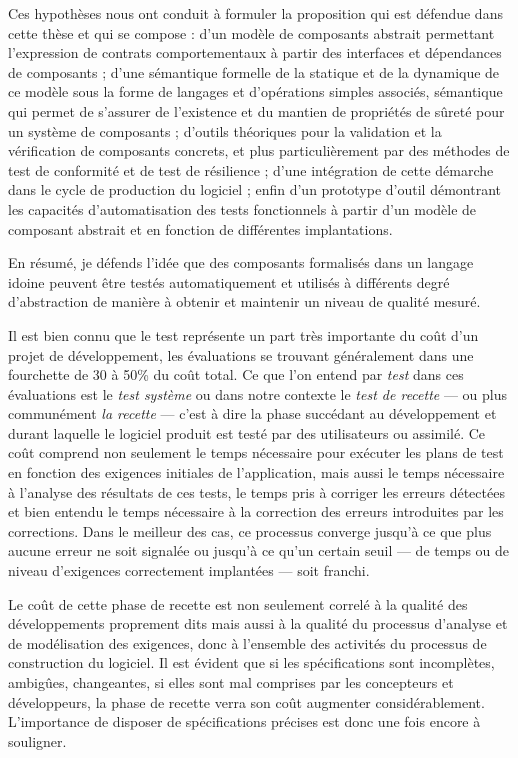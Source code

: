 Ces hypoth\`eses nous ont conduit \`a formuler la proposition qui
est d\'efendue dans cette th\`ese et qui se compose : d'un
mod\`ele de composants abstrait permettant l'expression de contrats
comportementaux \`a partir des interfaces et d\'ependances de
composants ; d'une s\'emantique formelle de la statique et de la dynamique de ce
mod\`ele sous la forme de langages et d'op\'erations simples
associ\'es, s\'emantique qui permet de s'assurer de l'existence et
du mantien de propri\'et\'es de s\^uret\'e pour un syst\`eme de
composants ; d'outils th\'eoriques pour la validation et la
v\'erification de composants concrets, et plus particuli\`erement par
des m\'ethodes de test de conformit\'e et de test de r\'esilience ;
d'une int\'egration de cette d\'emarche dans le cycle de production
du logiciel ; enfin d'un prototype d'outil d\'emontrant les
capacit\'es d'automatisation des tests fonctionnels \`a partir d'un
mod\`ele de composant abstrait et en fonction de diff\'erentes
implantations.

En r\'esum\'e, je d\'efends l'id\'ee que des composants
formalis\'es dans un langage idoine peuvent \^etre test\'es
automatiquement et utilis\'es \`a diff\'erents degr\'e
d'abstraction de mani\`ere \`a obtenir et maintenir un niveau
de qualit\'e mesur\'e.

Il est bien connu que le test repr\'esente un part tr\`es importante
du co\^ut d'un projet de d\'eveloppement, les \'evaluations se
trouvant g\'en\'eralement dans une fourchette de 30 \`a 50\% du
co\^ut total\cite{}. Ce que l'on entend par \emph{test} dans ces
\'evaluations est le \emph{test syst\`eme} ou dans notre contexte le
\emph{test de recette} --- ou plus commun\'ement \emph{la recette}
--- c'est \`a dire la phase succ\'edant au d\'eveloppement et
durant laquelle le logiciel produit est test\'e par des utilisateurs
ou assimil\'e. Ce co\^ut comprend non seulement le temps
n\'ecessaire pour ex\'ecuter les plans de test en
fonction des exigences initiales de l'application, mais aussi le temps
n\'ecessaire \`a l'analyse des r\'esultats de ces tests, le temps
pris \`a corriger les erreurs d\'etect\'ees et bien entendu le
temps n\'ecessaire \`a la correction des erreurs introduites par les
corrections. Dans le meilleur des cas, ce processus converge
jusqu'\`a ce que plus aucune erreur ne soit signal\'ee ou jusqu'\`a
ce qu'un certain seuil --- de temps ou de niveau d'exigences
correctement implant\'ees --- soit franchi.

Le co\^ut de cette phase de recette est non seulement correl\'e \`a
la qualit\'e des d\'eveloppements proprement dits mais aussi \`a la
qualit\'e du processus d'analyse et de mod\'elisation des exigences,
donc \`a l'ensemble des activit\'es du processus de construction du
logiciel. Il est \'evident que si les sp\'ecifications sont
incompl\`etes, ambig\^ues, changeantes, si elles sont mal comprises
par les concepteurs et d\'eveloppeurs, la phase de recette verra son
co\^ut augmenter consid\'erablement. L'importance de disposer de
sp\'ecifications pr\'ecises est donc une fois encore \`a
souligner. 

